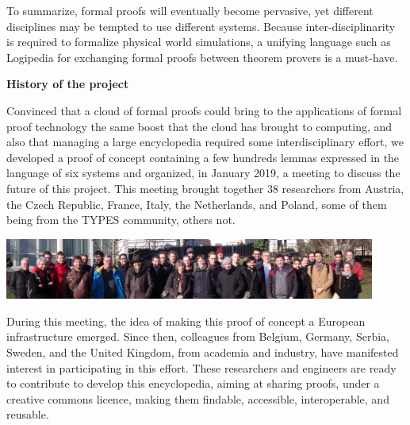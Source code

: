 To summarize, formal proofs will eventually become pervasive, yet
different disciplines may be tempted to use different systems.
Because inter-disciplinarity is required to formalize physical world
simulations, a unifying language such as Logipedia for exchanging
formal proofs between theorem provers is a must-have.

\begin{framed}

\begin{center}
{\bf \Large History of the project}
\end{center}

Convinced that a cloud of formal proofs could bring to the
applications of formal proof technology the same boost that the cloud
has brought to computing, and also that managing a large encyclopedia
required some interdisciplinary effort,
we developed a proof of concept containing a few hundreds lemmas
expressed in the language of six systems and organized, in January 2019,
a meeting to discuss the future of this project.
This
meeting brought together 38 researchers from Austria, the Czech
Republic, France, Italy, the Netherlands, and Poland, some of them
being from the TYPES community, others not.
\begin{center}
\includegraphics[height=2cm]{photo.png}
\end{center}
During this meeting, the idea of making this proof of concept a European
infrastructure emerged.
Since then,
colleagues from Belgium, Germany, Serbia, Sweden, and the United
Kingdom, from academia and industry, have manifested interest in
participating in this effort.  These researchers and engineers are
ready to contribute to develop this encyclopedia, aiming at sharing
proofs, under a creative commons licence, making them findable,
accessible, interoperable, and reusable.

\end{framed}

